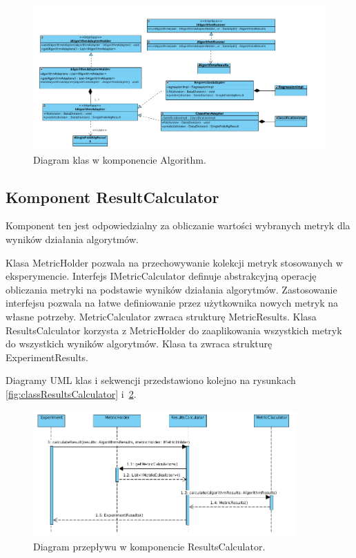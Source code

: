 \documentclass[12pt]{article}
\begin{document}
\begin{figure}[!h]
\centering
	\includegraphics[width=1.0\textwidth]{img/class_diagrams/algorithm.png}
	\caption{Diagram klas w komponencie Algorithm.}
	\label{fig:classAlgorithm}
\end{figure}
\newpage

\subsection{Komponent ResultCalculator}

Komponent ten jest odpowiedzialny za obliczanie wartości wybranych metryk dla wyników działania algorytmów.

Klasa MetricHolder pozwala na przechowywanie kolekcji metryk stosowanych w eksperymencie. Interfejs IMetricCalculator definuje abstrakcyjną operację obliczania metryki na podstawie wyników działania algorytmów. Zastosowanie interfejsu pozwala na łatwe definiowanie przez użytkownika nowych metryk na własne potrzeby. MetricCalculator zwraca strukturę MetricResults. Klasa ResultsCalculator korzysta z MetricHolder do zaaplikowania wszystkich metryk do wszystkich wyników algorytmów. Klasa ta zwraca strukturę ExperimentResults.


Diagramy UML klas i sekwencji przedstawiono kolejno na rysunkach \ref{fig:classResultsCalculator} i~\ref{fig:sequenceResultsCalculator}.

\begin{figure}[!h]
	\centering
	\includegraphics[width=0.9\textwidth]{img/sequenceResultsCalculator.png}
	\caption{Diagram przepływu w komponencie ResultsCalculator.}
	\label{fig:sequenceResultsCalculator}
\end{figure}
\end{document}
